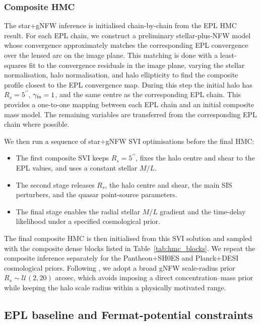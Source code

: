 \documentclass[fleqn,usenatbib]{mnras}
\begin{document}
\subsubsection{Composite HMC}

The star+gNFW inference is initialised chain-by-chain from the EPL HMC result. For each EPL chain, we construct a preliminary stellar-plus-NFW model whose convergence approximately matches the corresponding EPL convergence over the lensed arc on the image plane. This matching is done with a least-squares fit to the convergence residuals in the image plane, varying the stellar normalisation, halo normalisation, and halo ellipticity to find the composite profile closest to the EPL convergence map. During this step the initial halo has \(R_s=5^{\prime\prime}\), \(\gamma_{\rm in}=1\), and the same centre as the corresponding EPL chain. This provides a one-to-one mapping between each EPL chain and an initial composite mass model. The remaining variables are transferred from the corresponding EPL chain where possible.

We then run a sequence of star+gNFW SVI optimisations before the final HMC:
\begin{itemize}
\item The first composite SVI keeps \(R_s=5^{\prime\prime}\), fixes the halo centre and shear to the EPL values, and uses a constant stellar \(M/L\).
\item The second stage releases \(R_s\), the halo centre and shear, the main SIS perturbers, and the quasar point-source parameters.
\item The final stage enables the radial stellar \(M/L\) gradient and the time-delay likelihood under a specified cosmological prior.
\end{itemize}

The final composite HMC is then initialised from this SVI solution and sampled with the composite dense blocks listed in Table~\ref{tab:hmc_blocks}. We repeat the composite inference separately for the Pantheon+SH0ES and Planck+DESI cosmological priors. Following \citet{Tian2026}, we adopt a broad gNFW scale-radius prior \(R_s\sim\mathcal{U}(2,20)\) arcsec, which avoids imposing a direct concentration--mass prior while keeping the halo scale radius within a physically motivated range.

\subsection{EPL baseline and Fermat-potential constraints}
\label{sec:epl_fermat_results}
\end{document}
